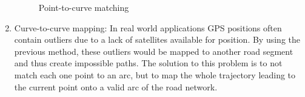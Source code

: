 \begin{enumerate}
\begin{figure}[H]
                        \caption{Point-to-curve matching~\cite{bernstein1996introduction}}
                        \label{fig:point-to-curve-matching}
                    \end{figure}
                \item Curve-to-curve mapping: In real world applications GPS positions often contain outliers due to a lack of satellites available for position.
                By using the previous method, these outliers would be mapped to another road segment and thus create impossible paths.
                The solution to this problem is to not match each one point to an arc, but to map the whole trajectory leading to the current point onto a valid arc of the road network.


            \end{enumerate}
